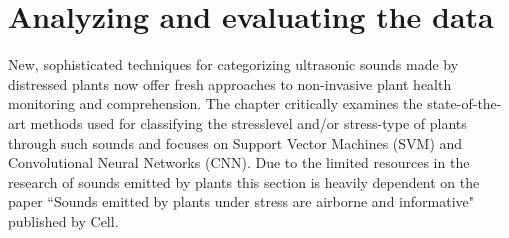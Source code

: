 \section{Analyzing and evaluating the data}

New, sophisticated techniques for categorizing ultrasonic sounds made by distressed plants now offer fresh approaches to non-invasive plant health monitoring and comprehension. The chapter critically examines the state-of-the-art methods used for classifying the stresslevel and/or stress-type of plants through such sounds and focuses on Support Vector Machines (SVM) and Convolutional Neural Networks (CNN). Due to the limited resources in the research of sounds emitted by plants this section is heavily dependent on the paper ``Sounds emitted by plants under stress are airborne and informative" \cite{Cell_Sounds_emitted_by_plants} published by Cell.







